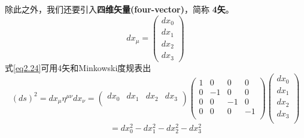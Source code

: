除此之外，我们还要引入{\bf{四维矢量(four-vector)}}，简称
{\bf{4矢}}。
\begin{equation}\label{2.25}
  dx_\mu =\left(\begin{array}{c}
            dx_0 \\
            dx_1 \\
            dx_2 \\
            dx_3
          \end{array}\right)
\end{equation}
式\ref{eq2.24}可用4矢和Minkowski度规表出
\[
  (ds)^2=dx_\mu \eta^{\mu\nu} dx_\nu
  =\left(
     \begin{array}{cccc}
       dx_0 & dx_1 & dx_2 & dx_3 \\
     \end{array}
   \right)
   \!\!\!
   \left(
     \begin{array}{cccc}
       1 & 0 & 0 & 0 \\
       0 & -1 & 0 & 0 \\
        0 & 0 & -1 & 0 \\
        0 & 0 & 0  & -1\\
     \end{array}
   \right)
   \!\!\!
   \left(
     \begin{array}{c}
       dx_0 \\
        dx_1 \\
       dx_2 \\
        dx_3\\
     \end{array}
   \right)
   \]
\begin{equation}\label{eq2.26}
   =dx_0^2-dx_1^2-dx_2^2-dx_3^2
\end{equation}

